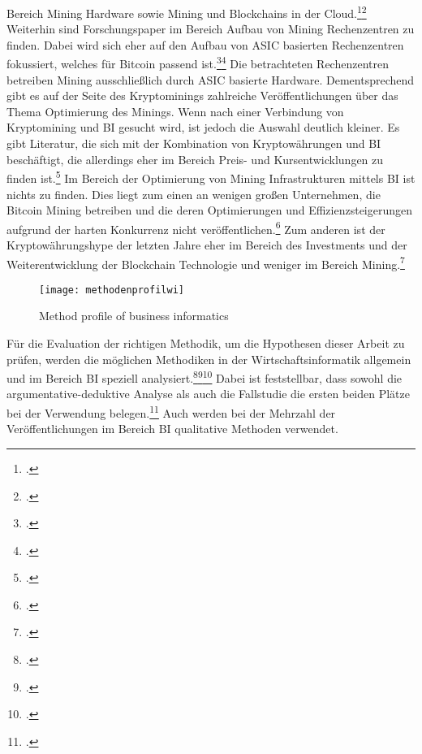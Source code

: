 \begin{enumerate}
    Bereich Mining Hardware sowie Mining und Blockchains in der Cloud.\footcite[Cf.][]{taylor2017evolution}\footcite[Cf.][]{gai2020blockchain} 
    Weiterhin sind Forschungspaper im Bereich Aufbau von Mining Rechenzentren zu finden. Dabei wird sich eher auf den Aufbau von
    \ac{ASIC} basierten Rechenzentren fokussiert, welches für Bitcoin passend ist.\footcite[Cf.][]{li2019blockchain}\footcite[Cf.][]{xie2018extreme}
    Die betrachteten Rechenzentren betreiben Mining ausschließlich durch \ac{ASIC} basierte Hardware. Dementsprechend gibt es auf der
    Seite des Kryptominings zahlreiche Veröffentlichungen über das Thema Optimierung des Minings. Wenn nach einer Verbindung von
    Kryptomining und \ac{BI} gesucht wird, ist jedoch die Auswahl deutlich kleiner. Es gibt Literatur, die sich mit der Kombination von
    Kryptowährungen und \ac{BI} beschäftigt, die allerdings eher im Bereich Preis- und Kursentwicklungen zu finden
    ist.\footcite[Cf.][]{botocs2017bitcoin} Im Bereich der Optimierung von Mining Infrastrukturen mittels \ac{BI} ist nichts zu finden.
    Dies liegt zum einen an wenigen großen Unternehmen, die Bitcoin Mining betreiben und die deren Optimierungen und Effizienzsteigerungen
    aufgrund der harten Konkurrenz nicht veröffentlichen.\footcite[Cf.][]{btccom2021miner} Zum anderen ist der Kryptowährungshype der
    letzten Jahre eher im Bereich des Investments und der Weiterentwicklung der Blockchain Technologie und weniger im Bereich
    Mining.\footcite[Cf.][]{friedlmaier2018disrupting} 
\end{enumerate} 

\begin{figure}[H]
    \caption{Method profile of business informatics}
    \texttt{[image: methodenprofilwi]}
    \label{figure:methodenprofilwi}
    \\
    \cite[Source: Based on][Fig. 3]{wilde2007forschungsmethoden}
\end{figure}

Für die Evaluation der richtigen Methodik, um die Hypothesen dieser Arbeit zu prüfen, werden die möglichen Methodiken in der
Wirtschaftsinformatik allgemein und im Bereich \ac{BI} speziell
analysiert.\footcite[Cf.][]{wilde2007forschungsmethoden}\footcite[Cf.][]{wilde2006methodenspektrum}\footcite[Cf.][]{jourdan2008business} 
Dabei ist feststellbar, dass sowohl die argumentative-deduktive Analyse als auch die Fallstudie die ersten beiden Plätze bei der
Verwendung belegen.\footcite[Cf.][Fig. 2]{wilde2007forschungsmethoden} Auch werden bei der Mehrzahl der Veröffentlichungen im Bereich
\ac{BI} qualitative Methoden verwendet.

